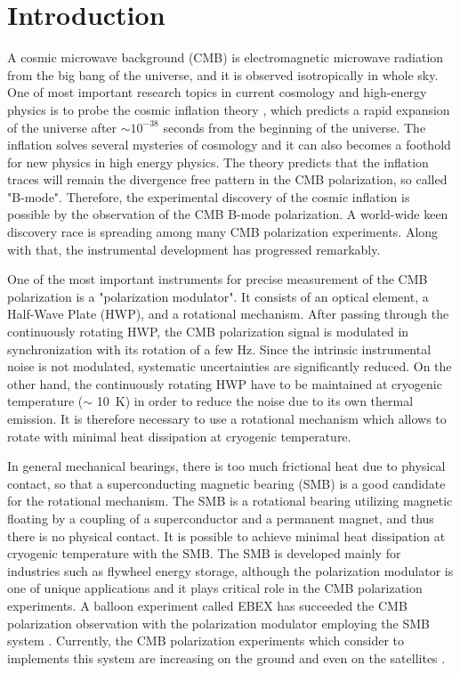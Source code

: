 \documentclass[a4paper]{jpconf}
\begin{document}
\section*{Introduction}

A cosmic microwave background (CMB) is electromagnetic microwave radiation from the big bang of the universe, and it is observed isotropically in whole sky.
One of most important research topics in current cosmology and high-energy physics is to probe the cosmic inflation theory \cite{inflation_sato,inflation_guth},
which predicts a rapid expansion of the universe after $\sim 10^{-38}$ seconds from the beginning of the universe.
The inflation solves several mysteries of cosmology and it can also becomes a foothold for new physics in high energy physics.
The theory predicts that the inflation traces will remain the divergence free pattern in the CMB polarization, so called "B-mode".
Therefore, the experimental discovery of the cosmic inflation is possible by the observation of the CMB B-mode polarization.
A world-wide keen discovery race is spreading among many CMB polarization experiments.
Along with that, the instrumental development has progressed remarkably.

One of the most important instruments for precise measurement of the CMB polarization is a "polarization modulator".
It consists of an optical element, a Half-Wave Plate (HWP), and a rotational mechanism.
After passing through the continuously rotating HWP, the CMB polarization signal is modulated in synchronization with its rotation of a few Hz.
Since the intrinsic instrumental noise is not modulated, systematic uncertainties are significantly reduced.
On the other hand, the continuously rotating HWP have to be maintained at cryogenic temperature ($\sim$ 10~K) in order to reduce the noise due to its own thermal emission.
It is therefore necessary to use a rotational mechanism which allows to rotate with minimal heat dissipation at cryogenic temperature.

In general mechanical bearings, there is too much frictional heat due to physical contact, so that a superconducting magnetic bearing (SMB) \cite{smb} is a good candidate for the rotational mechanism.
The SMB is a rotational bearing utilizing magnetic floating by a coupling of a superconductor and a permanent magnet, and thus there is no physical contact.
It is possible to achieve minimal heat dissipation at cryogenic temperature with the SMB.
The SMB is developed mainly for industries such as flywheel energy storage,
although the polarization modulator is one of unique applications and it plays critical role in the CMB polarization experiments.
A balloon experiment called EBEX has succeeded the CMB polarization observation with the polarization modulator employing the SMB system \cite{ebex}.
Currently, the CMB polarization experiments which consider to implements this system are increasing on the ground and even on the satellites \cite{litebird}.
\end{document}
